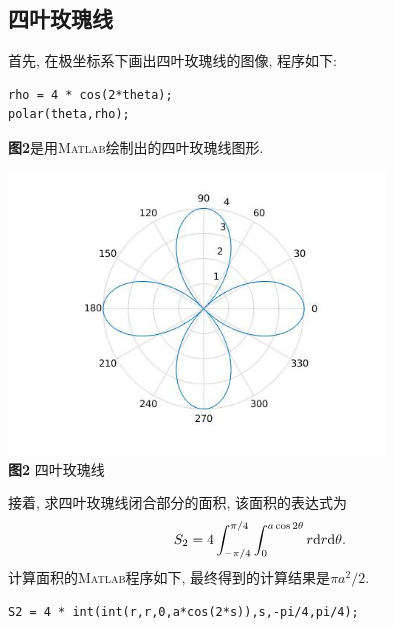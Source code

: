 \documentclass[a4paper,12pt]{article}
\begin{document}
\begin{CJK*}{UTF8}{gbsn}
\section{四叶玫瑰线}
首先, 在极坐标系下画出四叶玫瑰线的图像, 程序如下:\vspace{-15pt}
\begin{lstlisting}
rho = 4 * cos(2*theta);
polar(theta,rho);
\end{lstlisting}\par\vspace{10pt}
\textbf{图2}是用\textsc{Matlab}绘制出的四叶玫瑰线图形.\vspace{-5pt}
\begin{center}
\includegraphics[width = 10cm]{four_leaf_rose_curve.jpg}\\
\vspace{-15pt}\textbf{图2} 四叶玫瑰线\\
\end{center}\vspace{5pt}
接着, 求四叶玫瑰线闭合部分的面积, 该面积的表达式为
\begin{equation*}
S_2=4\int_{-\pi/4}^{\pi/4}\int_{0}^{a\cos{2\theta}}r{\rm d}r{\rm d}\theta.
\end{equation*}
计算面积的\textsc{Matlab}程序如下, 最终得到的计算结果是$\pi a^2/2$.\vspace{-15pt}
\begin{lstlisting}
S2 = 4 * int(int(r,r,0,a*cos(2*s)),s,-pi/4,pi/4);
\end{lstlisting}\par




\end{CJK*}
\end{document}

